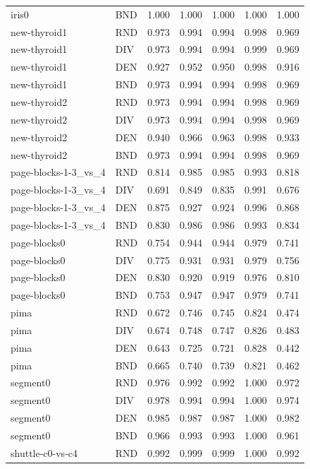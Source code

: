 \documentclass[10pt,a4paper]{article}
\begin{document}
\begin{longtable}{lllllrr}
iris0 & BND & 1.000 & 1.000 & 1.000 & 1.000 & 1.000 \\
new-thyroid1 & RND & 0.973 & 0.994 & 0.994 & 0.998 & 0.969 \\
new-thyroid1 & DIV & 0.973 & 0.994 & 0.994 & 0.999 & 0.969 \\
new-thyroid1 & DEN & 0.927 & 0.952 & 0.950 & 0.998 & 0.916 \\
new-thyroid1 & BND & 0.973 & 0.994 & 0.994 & 0.998 & 0.969 \\
new-thyroid2 & RND & 0.973 & 0.994 & 0.994 & 0.998 & 0.969 \\
new-thyroid2 & DIV & 0.973 & 0.994 & 0.994 & 0.998 & 0.969 \\
new-thyroid2 & DEN & 0.940 & 0.966 & 0.963 & 0.998 & 0.933 \\
new-thyroid2 & BND & 0.973 & 0.994 & 0.994 & 0.998 & 0.969 \\
page-blocks-1-3\_vs\_4 & RND & 0.814 & 0.985 & 0.985 & 0.993 & 0.818 \\
page-blocks-1-3\_vs\_4 & DIV & 0.691 & 0.849 & 0.835 & 0.991 & 0.676 \\
page-blocks-1-3\_vs\_4 & DEN & 0.875 & 0.927 & 0.924 & 0.996 & 0.868 \\
page-blocks-1-3\_vs\_4 & BND & 0.830 & 0.986 & 0.986 & 0.993 & 0.834 \\
page-blocks0 & RND & 0.754 & 0.944 & 0.944 & 0.979 & 0.741 \\
page-blocks0 & DIV & 0.775 & 0.931 & 0.931 & 0.979 & 0.756 \\
page-blocks0 & DEN & 0.830 & 0.920 & 0.919 & 0.976 & 0.810 \\
page-blocks0 & BND & 0.753 & 0.947 & 0.947 & 0.979 & 0.741 \\
pima & RND & 0.672 & 0.746 & 0.745 & 0.824 & 0.474 \\
pima & DIV & 0.674 & 0.748 & 0.747 & 0.826 & 0.483 \\
pima & DEN & 0.643 & 0.725 & 0.721 & 0.828 & 0.442 \\
pima & BND & 0.665 & 0.740 & 0.739 & 0.821 & 0.462 \\
segment0 & RND & 0.976 & 0.992 & 0.992 & 1.000 & 0.972 \\
segment0 & DIV & 0.978 & 0.994 & 0.994 & 1.000 & 0.974 \\
segment0 & DEN & 0.985 & 0.987 & 0.987 & 1.000 & 0.982 \\
segment0 & BND & 0.966 & 0.993 & 0.993 & 1.000 & 0.961 \\
shuttle-c0-vs-c4 & RND & 0.992 & 0.999 & 0.999 & 1.000 & 0.992 \\

\end{longtable}
\end{document}
